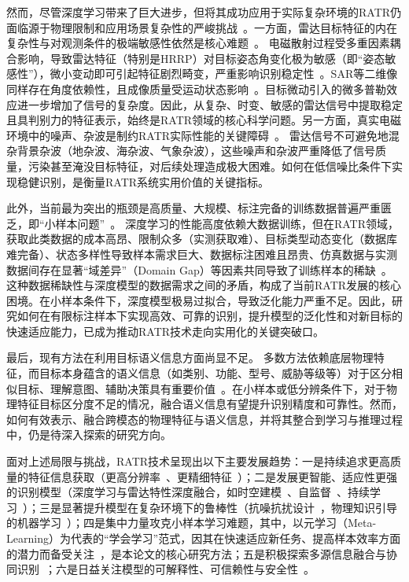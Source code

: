 然而，尽管深度学习带来了巨大进步，但将其成功应用于实际复杂环境的RATR仍面临源于物理限制和应用场景复杂性的严峻挑战~\cite{X}。{一方面，雷达目标特征的内在复杂性与对观测条件的极端敏感性依然是核心难题~\cite{X}。} 电磁散射过程受多重因素耦合影响，导致雷达特征（特别是HRRP）对目标姿态角变化极为敏感（即{“姿态敏感性”}），微小变动即可引起特征剧烈畸变，严重影响识别稳定性~\cite{X}。SAR等二维像同样存在角度依赖性，且成像质量受运动状态影响~\cite{X}。目标微动引入的微多普勒效应进一步增加了信号的复杂度。因此，从复杂、时变、敏感的雷达信号中提取稳定且具判别力的特征表示，始终是RATR领域的核心科学问题。{另一方面，真实电磁环境中的噪声、杂波是制约RATR实际性能的关键障碍~\cite{X}。} 雷达信号不可避免地混杂背景杂波（地杂波、海杂波、气象杂波），这些{噪声和杂波}严重降低了信号质量，污染甚至淹没目标特征，对后续处理造成极大困难。如何在低信噪比条件下实现{稳健识别}，是衡量RATR系统实用价值的关键指标。

{此外，当前最为突出的瓶颈是高质量、大规模、标注完备的训练数据普遍严重匮乏，即“小样本问题”~\cite{X}。} 深度学习的性能高度依赖大数据训练，但在RATR领域，获取此类数据的成本高昂、限制众多（实测获取难）、目标类型动态变化（数据库难完备）、状态多样性导致样本需求巨大、数据标注困难且昂贵、仿真数据与实测数据间存在显著“域差异”（Domain Gap）等因素共同导致了训练样本的稀缺~\cite{X}。这种数据稀缺性与深度模型的数据需求之间的矛盾，构成了当前RATR发展的核心困境。在小样本条件下，深度模型极易{过拟合}，导致{泛化能力}严重不足。因此，研究如何在有限标注样本下实现高效、可靠的识别，提升模型的泛化性和对新目标的快速适应能力，已成为推动RATR技术走向实用化的关键突破口。

{最后，现有方法在利用目标语义信息方面尚显不足。} 多数方法依赖底层物理特征，而目标本身蕴含的{语义信息}（如类别、功能、型号、威胁等级等）对于区分相似目标、理解意图、辅助决策具有重要价值~\cite{X}。在小样本或低分辨条件下，对于物理特征目标区分度不足的情况，融合语义信息有望提升识别精度和可靠性。然而，如何有效表示、融合跨模态的物理特征与语义信息，并将其整合到学习与推理过程中，仍是待深入探索的研究方向。

面对上述局限与挑战，RATR技术呈现出以下主要发展趋势：一是持续追求更高质量的特征信息获取（更高分辨率~\cite{X}、更精细特征~\cite{X}）；二是发展更智能、适应性更强的识别模型（深度学习与雷达特性深度融合，如时空建模~\cite{X}、自监督~\cite{X}、持续学习~\cite{X}）；三是显著提升模型在复杂环境下的鲁棒性（抗噪抗扰设计~\cite{X}，物理知识引导的机器学习~\cite{X}）；四是{集中力量攻克小样本学习难题}，其中，以{元学习（Meta-Learning）}为代表的“学会学习”范式，因其在快速适应新任务、提高样本效率方面的潜力而备受关注~\cite{X}，是本论文的核心研究方法；五是积极探索多源信息融合与协同识别~\cite{X}；六是日益关注模型的可解释性、可信赖性与安全性~\cite{X}。

